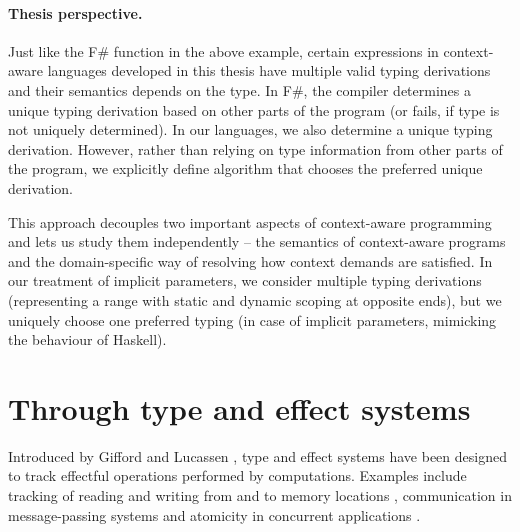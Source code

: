 \paragraph{Thesis perspective.}
Just like the F\# function in the above example, certain expressions in context-aware languages
developed in this thesis have multiple valid typing derivations and their semantics depends on the
type. In F\#, the compiler determines a unique typing derivation based on other parts of the program
(or fails, if type is not uniquely determined). In our languages, we also determine a unique typing
derivation. However, rather than relying on type information from other parts of the program, we
explicitly define algorithm that chooses the preferred unique derivation.

This approach decouples two important aspects of context-aware programming and lets us study them
independently -- the semantics of context-aware programs and the domain-specific way of resolving
how context demands are satisfied. In our treatment of implicit parameters, we consider
multiple typing derivations (representing a range with static and dynamic scoping at opposite ends),
but we uniquely choose one preferred typing (in case of implicit parameters, mimicking the
behaviour of Haskell).



%
%

\section{Through type and effect systems}
\label{sec:path-eff}

Introduced by Gifford and Lucassen \cite{effects-gifford,effects-polymorphic}, type and effect
systems have been designed to track effectful operations performed by computations. Examples
include tracking of reading and writing from and to memory locations \cite{effects-talpin-et-al},
communication in message-passing systems \cite{effects-messagepassing} and atomicity in concurrent
applications \cite{effects-atomicity}.

